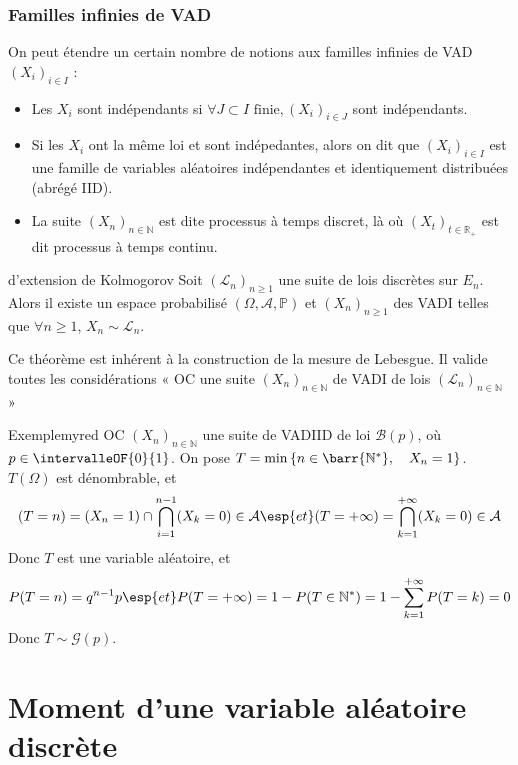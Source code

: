     \subsubsection{Familles infinies de VAD}

    On peut étendre un certain nombre de notions aux familles infinies de VAD $(X_i)_{i \in I}$ :
    \begin{itemize}
        \item Les $X_i$ sont indépendants si $\forall J \subset I \text{ finie}, (X_i)_{i \in J}$ sont indépendants.
        \item Si les $X_i$ ont la même loi et sont indépedantes, alors on dit que $(X_i)_{i \in I}$ est une famille de variables aléatoires indépendantes et identiquement distribuées (abrégé IID).
        \item La suite $(X_n)_{n \in \mathbb{N}}$ est dite processus à temps discret, là où $(X_t)_{t \in \mathbb{R}_+}$ est dit processus à temps continu.
    \end{itemize}

    \begin{theo}{d’extension de Kolmogorov}{}
        Soit $(\mathcal{L}_n)_{n \geq 1}$ une suite de lois discrètes sur $E_n$. Alors il existe un espace probabilisé $(\Omega, \mathcal{A}, \mathbb{P})$ et $(X_n)_{n \geq 1}$ des VADI telles que $\forall n \geq 1$, $X_n \sim \mathcal{L}_n$.
    \end{theo}

    Ce théorème est inhérent à la construction de la mesure de Lebesgue. Il valide toutes les considérations « OC une suite $(X_n)_{n \in \mathbb{N}}$ de VADI de lois $(\mathcal{L}_n)_{n \in \mathbb{N}} $ »

    \begin{omed}{Exemple}{myred}
        OC $(X_n)_{n \in \mathbb{N}}$ une suite de VADIID de loi $\mathcal{B}(p)$, où $p \in \intervalleOF{0}{1}$. On pose $T = \min\left\{n \in \barr{\mathbb{N}^*}, \quad X_n = 1\right\}$. $T(\Omega)$ est dénombrable, et 
        \[ (T = n) = (X_n = 1) \cap \bigcap_{i = 1}^{n-1} (X_k = 0) \in \mathcal{A} \esp{et} (T = +\infty) = \bigcap_{k=1}^{+\infty} (X_k = 0) \in \mathcal{A} \]   
        Donc $T$ est une variable aléatoire, et 
        \[ P(T = n) = q^{n-1} p \esp{et} P(T = +\infty) = 1 - P(T \in \mathbb{N}^*) = 1 - \sum_{k=1}^{+\infty} P(T = k) = 0 \]   
        Donc $T \sim \mathcal{G}(p)$.
    \end{omed}

\section{Moment d’une variable aléatoire discrète}

